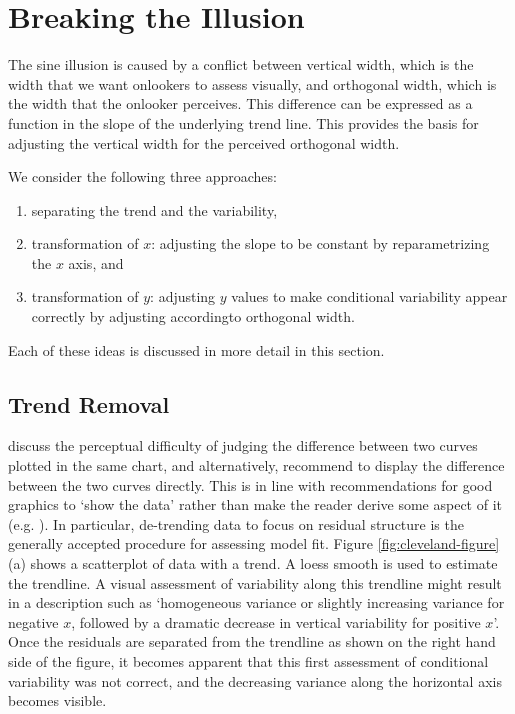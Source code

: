 \documentclass[11pt]{isuthesis}\usepackage[]{graphicx}\usepackage[]{color}
\begin{document}
\section{Breaking the Illusion}
The sine  illusion is caused by a conflict between vertical width, which is the width that we want onlookers to assess visually, and orthogonal width, which is the width that the onlooker perceives. This difference can be expressed as a function in the slope of the underlying trend line. This provides the basis for adjusting the vertical width for the perceived orthogonal width. 

We consider the following three approaches:  
\begin{enumerate}
\item separating the trend and the variability, 
\item transformation of $x$: adjusting the slope to be constant by reparametrizing the $x$ axis, and
\item transformation of $y$: adjusting $y$ values to make conditional variability  appear correctly by adjusting accordingto orthogonal width. 
\end{enumerate}
Each of these ideas is discussed in more detail in this section.

\subsection{Trend Removal}
\citet{cleveland:1984, cleveland:1985} discuss the perceptual difficulty of judging the difference between two curves plotted in the same chart, and alternatively, recommend to display the difference between the two curves directly. This is in line with  recommendations  for good graphics to `show the data' rather than make the reader derive some aspect of it (e.g. \citet{wainer:2000}). In particular, de-trending data to focus on residual structure is the generally accepted procedure for assessing model fit. 
 Figure \ref{fig:cleveland-figure}(a) shows a scatterplot of data with a trend. A loess smooth is used to estimate the trendline. A visual assessment of variability along this trendline
might result in a description such as `homogeneous variance or slightly increasing variance for  negative $x$, followed by a dramatic decrease in vertical variability for positive $x$'.  
Once the residuals are separated from the trendline as shown on the right hand side of the figure, it becomes apparent that this first assessment of conditional variability was not correct, and the decreasing variance along the horizontal axis becomes visible.
 
\end{document}
